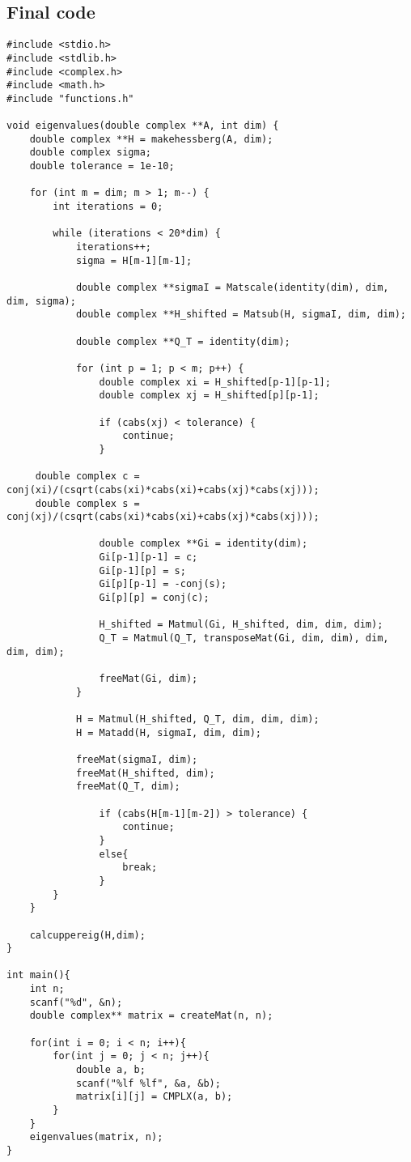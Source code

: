 \documentclass[a4paper,12pt]{article}
\theoremstyle{remark}
\begin{document}
\subsection{Final code}
\begin{verbatim}
#include <stdio.h>
#include <stdlib.h>
#include <complex.h>
#include <math.h>
#include "functions.h"

void eigenvalues(double complex **A, int dim) {
    double complex **H = makehessberg(A, dim);
    double complex sigma;
    double tolerance = 1e-10;

    for (int m = dim; m > 1; m--) {
        int iterations = 0;

        while (iterations < 20*dim) {
            iterations++;
            sigma = H[m-1][m-1];

            double complex **sigmaI = Matscale(identity(dim), dim, dim, sigma);
            double complex **H_shifted = Matsub(H, sigmaI, dim, dim);

            double complex **Q_T = identity(dim);

            for (int p = 1; p < m; p++) {
                double complex xi = H_shifted[p-1][p-1];
                double complex xj = H_shifted[p][p-1];

                if (cabs(xj) < tolerance) {
                    continue;
                }

     double complex c = conj(xi)/(csqrt(cabs(xi)*cabs(xi)+cabs(xj)*cabs(xj)));
     double complex s = conj(xj)/(csqrt(cabs(xi)*cabs(xi)+cabs(xj)*cabs(xj)));

                double complex **Gi = identity(dim);
                Gi[p-1][p-1] = c;
                Gi[p-1][p] = s;
                Gi[p][p-1] = -conj(s);
                Gi[p][p] = conj(c);

                H_shifted = Matmul(Gi, H_shifted, dim, dim, dim);
                Q_T = Matmul(Q_T, transposeMat(Gi, dim, dim), dim, dim, dim);

                freeMat(Gi, dim);
            }

            H = Matmul(H_shifted, Q_T, dim, dim, dim);
            H = Matadd(H, sigmaI, dim, dim);

            freeMat(sigmaI, dim);
            freeMat(H_shifted, dim);
            freeMat(Q_T, dim);

                if (cabs(H[m-1][m-2]) > tolerance) {
                    continue;
                }
                else{
                	break;
                }
        }
    }

    calcuppereig(H,dim);
}

int main(){
    int n;
    scanf("%d", &n);
    double complex** matrix = createMat(n, n);

    for(int i = 0; i < n; i++){
        for(int j = 0; j < n; j++){
            double a, b;
            scanf("%lf %lf", &a, &b);
            matrix[i][j] = CMPLX(a, b);
        }
    }
    eigenvalues(matrix, n);
}
\end{verbatim}
\end{document}
